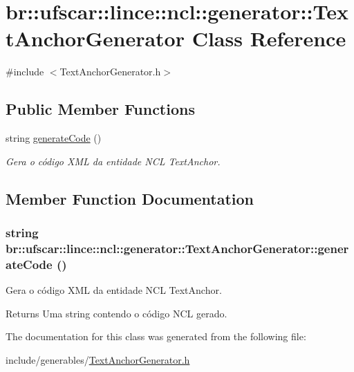 \hypertarget{classbr_1_1ufscar_1_1lince_1_1ncl_1_1generator_1_1TextAnchorGenerator}{
\section{br::ufscar::lince::ncl::generator::TextAnchorGenerator Class Reference}
\label{classbr_1_1ufscar_1_1lince_1_1ncl_1_1generator_1_1TextAnchorGenerator}
}


{\ttfamily \#include $<$TextAnchorGenerator.h$>$}

\subsection*{Public Member Functions}
\begin{DoxyCompactItemize}
\item 
string \hyperlink{classbr_1_1ufscar_1_1lince_1_1ncl_1_1generator_1_1TextAnchorGenerator_a0b33af3db3d29c6818aa9fcea94bae58}{generateCode} ()
\begin{DoxyCompactList}\small\item\em Gera o código XML da entidade NCL TextAnchor. \item\end{DoxyCompactList}\end{DoxyCompactItemize}


\subsection{Member Function Documentation}
\hypertarget{classbr_1_1ufscar_1_1lince_1_1ncl_1_1generator_1_1TextAnchorGenerator_a0b33af3db3d29c6818aa9fcea94bae58}{
\subsubsection[{generateCode}]{\setlength{\rightskip}{0pt plus 5cm}string br::ufscar::lince::ncl::generator::TextAnchorGenerator::generateCode ()}}
\label{classbr_1_1ufscar_1_1lince_1_1ncl_1_1generator_1_1TextAnchorGenerator_a0b33af3db3d29c6818aa9fcea94bae58}


Gera o código XML da entidade NCL TextAnchor. 

\begin{DoxyReturn}{Returns}
Uma string contendo o código NCL gerado. 
\end{DoxyReturn}


The documentation for this class was generated from the following file:\begin{DoxyCompactItemize}
\item 
include/generables/\hyperlink{TextAnchorGenerator_8h}{TextAnchorGenerator.h}\end{DoxyCompactItemize}
